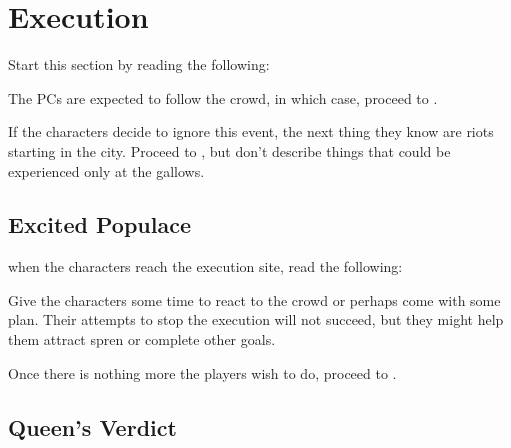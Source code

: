 \section{Execution}
\label{sec:execution}

Start this section by reading the following:


The PCs are expected to follow the crowd, in which case, proceed to .

If the characters decide to ignore this event, the next thing they know are riots starting in the city. Proceed to , but don't describe things that could be experienced only at the gallows.

\subsection{Excited Populace}
\label{ssec:executionExcitement}

when the characters reach the execution site, read the following:


Give the characters some time to react to the crowd or perhaps come with some plan. Their attempts to stop the execution will not succeed, but they might help them attract spren or complete other goals.

Once there is nothing more the players wish to do, proceed to .




\subsection{Queen's Verdict}
\label{ssec:executionVerdict}

